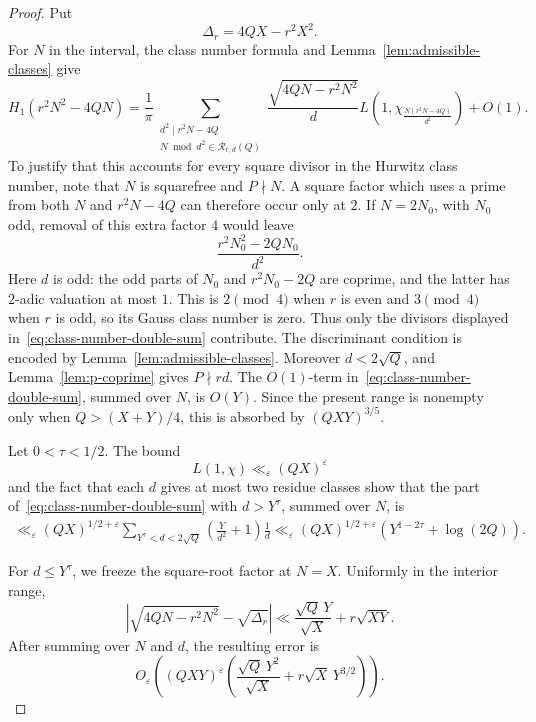 \documentclass[12pt,reqno]{amsart}
\numberwithin{equation}{section}
\theoremstyle{plain}
\theoremstyle{definition}
\theoremstyle{remark}
\begin{document}
\begin{proof}
Put
\[
\Delta_r=4QX-r^2X^2.
\]
For $N$ in the interval, the class number formula and
Lemma~\ref{lem:admissible-classes} give
\begin{equation}\label{eq:class-number-double-sum}
H_1(r^2N^2-4QN)
=
\frac1\pi
\sum_{\substack{d^2\mid r^2N-4Q\\
N\bmod d^2\in\mathcal R_{r,d}(Q)}}
\frac{\sqrt{4QN-r^2N^2}}{d}
L\left(1,\chi_{\frac{N(r^2N-4Q)}{d^2}}\right)
+
O(1).
\end{equation}
To justify that this accounts for every square divisor in the Hurwitz class number, note that $N$ is squarefree and $P\nmid N$.
A square factor which uses a prime from both $N$ and $r^2N-4Q$ can therefore occur only at $2$.
If $N=2N_0$, with $N_0$ odd, removal of this extra factor $4$ would leave
\[
\frac{r^2N_0^2-2QN_0}{d^2}.
\]
Here $d$ is odd: the odd parts of $N_0$ and
$r^2N_0-2Q$ are coprime, and the latter has $2$-adic valuation at most $1$.
This is $2\pmod4$ when $r$ is even and $3\pmod4$ when $r$ is odd, so its Gauss class number is zero.
Thus only the divisors displayed in~\eqref{eq:class-number-double-sum} contribute.
The discriminant condition is encoded by Lemma~\ref{lem:admissible-classes}.
Moreover $d<2\sqrt Q$, and Lemma~\ref{lem:p-coprime} gives $P\nmid rd$.
The $O(1)$-term in~\eqref{eq:class-number-double-sum}, summed over $N$, is $O(Y)$.
Since the present range is nonempty only when $Q>(X+Y)/4$, this is absorbed by $(QXY)^{3/5}$.

Let $0<\tau<1/2$.
The bound
\[
L(1,\chi)\ll_\varepsilon(QX)^\varepsilon
\]
and the fact that each $d$ gives at most two residue classes show that the part of~\eqref{eq:class-number-double-sum} with $d>Y^\tau$, summed over $N$, is
\begin{align}
\ll_\varepsilon
(QX)^{1/2+\varepsilon}
\sum_{Y^\tau<d<2\sqrt Q}
\left(\frac{Y}{d^2}+1\right)\frac1d
\ll_\varepsilon
(QX)^{1/2+\varepsilon}
\left(Y^{1-2\tau}+\log(2Q)\right).
\label{eq:large-d}
\end{align}

For $d\leq Y^\tau$, we freeze the square-root factor at $N=X$.
Uniformly in the interior range,
\[
\left|
\sqrt{4QN-r^2N^2}-\sqrt{\Delta_r}
\right|
\ll
\frac{\sqrt Q\,Y}{\sqrt X}
+r\sqrt{XY}.
\]
After summing over $N$ and $d$, the resulting error is
\begin{equation}\label{eq:square-root-variation}
O_\varepsilon\left(
(QXY)^\varepsilon
\left(
\frac{\sqrt Q\,Y^2}{\sqrt X}
+r\sqrt X\,Y^{3/2}
\right)
\right).
\end{equation}


\end{proof}
\end{document}
